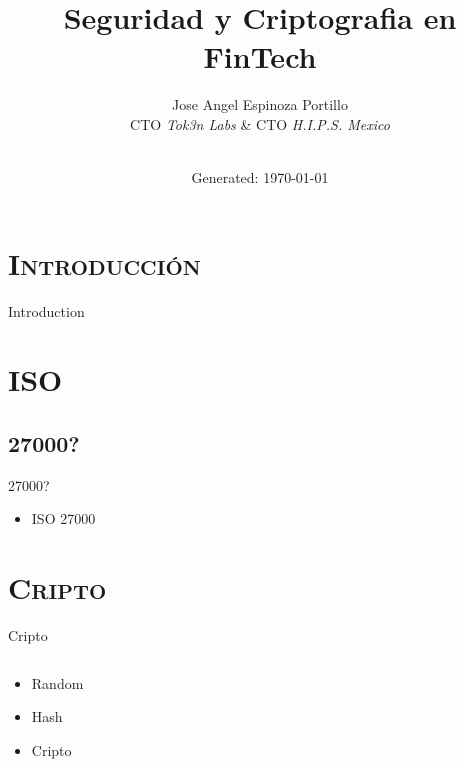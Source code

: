 \documentclass[xcolor=x11names,compress]{beamer}
\renewcommand{\(}{\begin{columns}}
\renewcommand{\)}{\end{columns}}
\newcommand{\<}[1]{\begin{column}{#1}}
\renewcommand{\>}{\end{column}}
\begin{document}
\section{\scshape Introducci\'{o}n}
\begin{frame}
\title{Seguridad y Criptografia en FinTech}
\author{
	Jose Angel Espinoza Portillo\\
	CTO {\it Tok3n Labs} \& CTO {\it H.I.P.S. Mexico }\\
}
\date{
	\\
	Generated: \today
}
\titlepage
\end{frame}

\begin{frame}{Introduction}
\tableofcontents
\end{frame}

\section{\scshape ISO}
\subsection{27000?}
\begin{frame}{27000?}
\begin{itemize}
  \item ISO 27000
\end{itemize}
\end{frame}

\section{\scshape Cripto}
\begin{frame}{Cripto}
    \begin{columns}[T]
        \begin{column}[T]{5cm} %
             \begin{itemize}
                 \item Random
                 \item Hash
                 \item Cripto
             \end{itemize}
        \end{column}
        
        \begin{column}[T]{10cm}
        \end{column}

    \end{columns}

\end{frame}
\end{document}
